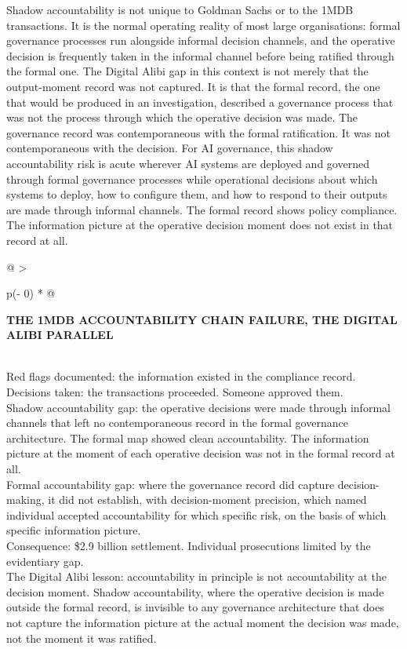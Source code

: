 Shadow accountability is not unique to Goldman Sachs or to the 1MDB transactions. It is the normal operating reality of most large organisations: formal governance processes run alongside informal decision channels, and the operative decision is frequently taken in the informal channel before being ratified through the formal one. The Digital Alibi gap in this context is not merely that the output-moment record was not captured. It is that the formal record, the one that would be produced in an investigation, described a governance process that was not the process through which the operative decision was made. The governance record was contemporaneous with the formal ratification. It was not contemporaneous with the decision. For AI governance, this shadow accountability risk is acute wherever AI systems are deployed and governed through formal governance processes while operational decisions about which systems to deploy, how to configure them, and how to respond to their outputs are made through informal channels. The formal record shows policy compliance. The information picture at the operative decision moment does not exist in that record at all.

\begin{longtable}[]{@{}
  >{\raggedright\arraybackslash}p{(\columnwidth - 0\tabcolsep) * }@{}}
\toprule\noalign{}
\begin{minipage}[b]{\linewidth}\raggedright
\textbf{THE 1MDB ACCOUNTABILITY CHAIN FAILURE, THE DIGITAL ALIBI PARALLEL}
\end{minipage} \\
\midrule\noalign{}
\endhead
\bottomrule\noalign{}
\endlastfoot
Red flags documented: the information existed in the compliance record. \\
Decisions taken: the transactions proceeded. Someone approved them. \\
Shadow accountability gap: the operative decisions were made through informal channels that left no contemporaneous record in the formal governance architecture. The formal map showed clean accountability. The information picture at the moment of each operative decision was not in the formal record at all. \\
Formal accountability gap: where the governance record did capture decision-making, it did not establish, with decision-moment precision, which named individual accepted accountability for which specific risk, on the basis of which specific information picture. \\
Consequence: \$2.9 billion settlement. Individual prosecutions limited by the evidentiary gap. \\
The Digital Alibi lesson: accountability in principle is not accountability at the decision moment. Shadow accountability, where the operative decision is made outside the formal record, is invisible to any governance architecture that does not capture the information picture at the actual moment the decision was made, not the moment it was ratified. \\
\end{longtable}

